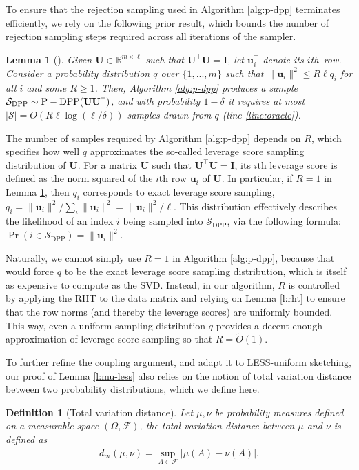\documentclass[11pt]{article}
\let\origtop\top
\renewcommand\top{{\scriptscriptstyle{\origtop}}}
\def\DPP{\mathrm{DPP}}
\def\PDPP{\mathrm{P\textnormal{-}DPP}}
\def\u{{\mathbf u}}
\def\I{{\mathbf I}}
\def\setS{{\mathcal S}}
\def\R{{\mathbf R}}
\def\U{{\mathbf U}}
\def\R{{\mathds R}}
\newtheorem{lem}[thm]{Lemma}
\newtheorem{dfn}[thm]{Definition}
\begin{document}
To ensure that the rejection sampling used in Algorithm \ref{alg:p-dpp} terminates efficiently, we rely on the following prior result, which bounds the number of rejection sampling steps required across all iterations of the sampler.
\begin{lem}[\cite{derezinski2019minimax}]\label{l:p-dpp}
Given $\U\in\R^{m\times \ell}$ such that $\U^\top\U=\I$, let $\u_i^\top$ denote its $i$th~row. Consider a probability distribution $q$ over $\{1,...,m\}$ such that $\|\u_i\|^2\leq R\ell q_i$ for all $i$ and some $R\geq 1$. Then, Algorithm \ref{alg:p-dpp} produces a sample $\setS_{\DPP}\sim \PDPP(\U\U^\top)$, and with probability $1-\delta$ it requires at most $|\setS|=O(R\ell\log(\ell/\delta))$ samples drawn from $q$ (line \ref{line:oracle}). 
\end{lem}

The number of samples required by Algorithm \ref{alg:p-dpp} depends on $R$, which specifies how well $q$ approximates the so-called leverage score sampling distribution of $\U$. For a matrix $\U$ such that $\U^\top\U=\I$, its $i$th leverage score is defined as the norm squared of the $i$th row $\u_i$ of $\U$. In particular, if $R=1$ in Lemma \ref{l:p-dpp}, then $q_i$ corresponds to exact leverage score sampling, $q_i=\|\u_i\|^2/\sum_i\|\u_i\|^2 = \|\u_i\|^2/\ell$. This distribution effectively describes the likelihood of an index $i$ being sampled into $\setS_{\DPP}$, via the following formula: $\Pr(i\in\setS_{\DPP})=\|\u_i\|^2$. 


Naturally, we cannot simply use $R=1$ in Algorithm \ref{alg:p-dpp}, because that would force $q$ to be the exact leverage score sampling distribution, which is itself as expensive to compute as the SVD.
Instead, in our algorithm, $R$ is controlled by applying the RHT to the data matrix and relying on Lemma \ref{l:rht} to ensure that the row norms (and thereby the leverage scores) are uniformly bounded. This way, even a uniform sampling distribution $q$ provides a decent enough approximation of leverage score sampling so that $R=\tilde O(1)$.

To further refine the coupling argument, and adapt it to LESS-uniform sketching, our proof of Lemma \ref{l:mu-less} also relies on the notion of total variation distance between two probability distributions, which we define here.

\begin{dfn}[Total variation distance]
Let $\mu, \nu$ be probability measures defined on a measurable space $(\Omega, \mathcal{F})$, the total variation distance between $\mu$ and $\nu$ is defined as
\begin{align*}
d_{\mathrm{tv}}(\mu, \nu) = \sup_{A\in\mathcal{F}} |\mu(A) - \nu(A)|.
\end{align*}
\end{dfn}
\end{document}
